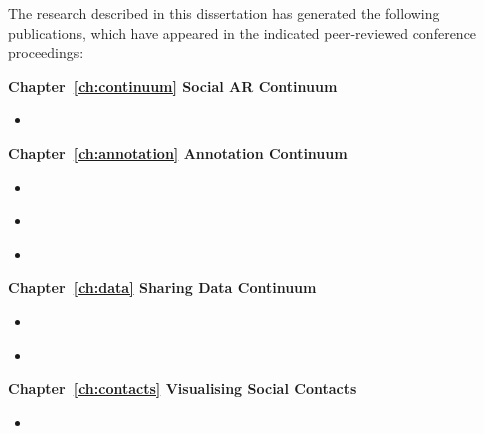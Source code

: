 \begin{preface}
\addchaptertocentry{\prefacename} %

The research described in this dissertation has generated the following publications, which have appeared in the indicated peer-reviewed conference proceedings:

\preto{}

\noindent
\textbf{Chapter~\ref{ch:continuum} Social AR Continuum}
\begin{itemize}
    \item{ }
\end{itemize}

\noindent
\textbf{Chapter~\ref{ch:annotation} Annotation Continuum}
\begin{itemize}
    \item{ }
    \item{ }
    \item{ }
\end{itemize}

\noindent
\textbf{Chapter~\ref{ch:data} Sharing Data Continuum}
\begin{itemize}
    \item{ }
    \item{ }
\end{itemize}

\noindent
\textbf{Chapter~\ref{ch:contacts} Visualising Social Contacts}
\begin{itemize}
    \item{ }
\end{itemize}

\end{preface}